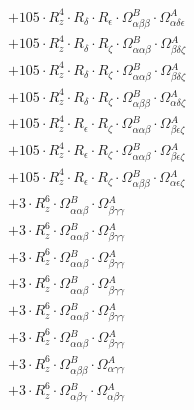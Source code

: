 \documentclass{article}
\begin{document}
\begin{subequations}
\begin{gather}
\begin{array}{c}
 \\[0.2em] 		 + 105 \cdot R_{z}^{4} \cdot R_{\delta{}} \cdot R_{\epsilon{}} \cdot \Omega{}^{B}_{\alpha{}\beta{}\beta{}} \cdot \Omega{}^{A}_{\alpha{}\delta{}\epsilon{}} 
 \\[0.2em] 		 + 105 \cdot R_{z}^{4} \cdot R_{\delta{}} \cdot R_{\zeta{}} \cdot \Omega{}^{B}_{\alpha{}\alpha{}\beta{}} \cdot \Omega{}^{A}_{\beta{}\delta{}\zeta{}} 
 \\[0.2em] 		 + 105 \cdot R_{z}^{4} \cdot R_{\delta{}} \cdot R_{\zeta{}} \cdot \Omega{}^{B}_{\alpha{}\alpha{}\beta{}} \cdot \Omega{}^{A}_{\beta{}\delta{}\zeta{}} 
 \\[0.2em] 		 + 105 \cdot R_{z}^{4} \cdot R_{\delta{}} \cdot R_{\zeta{}} \cdot \Omega{}^{B}_{\alpha{}\beta{}\beta{}} \cdot \Omega{}^{A}_{\alpha{}\delta{}\zeta{}} 
 \\[0.2em] 		 + 105 \cdot R_{z}^{4} \cdot R_{\epsilon{}} \cdot R_{\zeta{}} \cdot \Omega{}^{B}_{\alpha{}\alpha{}\beta{}} \cdot \Omega{}^{A}_{\beta{}\epsilon{}\zeta{}} 
 \\[0.2em] 		 + 105 \cdot R_{z}^{4} \cdot R_{\epsilon{}} \cdot R_{\zeta{}} \cdot \Omega{}^{B}_{\alpha{}\alpha{}\beta{}} \cdot \Omega{}^{A}_{\beta{}\epsilon{}\zeta{}} 
 \\[0.2em] 		 + 105 \cdot R_{z}^{4} \cdot R_{\epsilon{}} \cdot R_{\zeta{}} \cdot \Omega{}^{B}_{\alpha{}\beta{}\beta{}} \cdot \Omega{}^{A}_{\alpha{}\epsilon{}\zeta{}} 
 \\[0.2em] 		 + 3 \cdot R_{z}^{6} \cdot \Omega{}^{B}_{\alpha{}\alpha{}\beta{}} \cdot \Omega{}^{A}_{\beta{}\gamma{}\gamma{}} 
 \\[0.2em] 		 + 3 \cdot R_{z}^{6} \cdot \Omega{}^{B}_{\alpha{}\alpha{}\beta{}} \cdot \Omega{}^{A}_{\beta{}\gamma{}\gamma{}} 
 \\[0.2em] 		 + 3 \cdot R_{z}^{6} \cdot \Omega{}^{B}_{\alpha{}\alpha{}\beta{}} \cdot \Omega{}^{A}_{\beta{}\gamma{}\gamma{}} 
 \\[0.2em] 		 + 3 \cdot R_{z}^{6} \cdot \Omega{}^{B}_{\alpha{}\alpha{}\beta{}} \cdot \Omega{}^{A}_{\beta{}\gamma{}\gamma{}} 
 \\[0.2em] 		 + 3 \cdot R_{z}^{6} \cdot \Omega{}^{B}_{\alpha{}\alpha{}\beta{}} \cdot \Omega{}^{A}_{\beta{}\gamma{}\gamma{}} 
 \\[0.2em] 		 + 3 \cdot R_{z}^{6} \cdot \Omega{}^{B}_{\alpha{}\alpha{}\beta{}} \cdot \Omega{}^{A}_{\beta{}\gamma{}\gamma{}} 
 \\[0.2em] 		 + 3 \cdot R_{z}^{6} \cdot \Omega{}^{B}_{\alpha{}\beta{}\beta{}} \cdot \Omega{}^{A}_{\alpha{}\gamma{}\gamma{}} 
 \\[0.2em] 		 + 3 \cdot R_{z}^{6} \cdot \Omega{}^{B}_{\alpha{}\beta{}\gamma{}} \cdot \Omega{}^{A}_{\alpha{}\beta{}\gamma{}} 

\end{array}
\end{gather}
\end{subequations}
\end{document}
